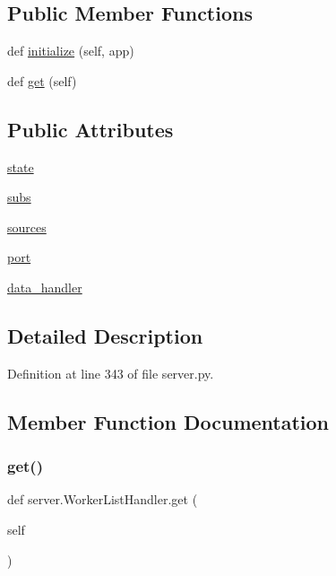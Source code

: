 \subsection*{Public Member Functions}
\begin{DoxyCompactItemize}
\item 
def \hyperlink{classserver_1_1WorkerListHandler_a843945560a336050078a4e45bd4f12ba}{initialize} (self, app)
\item 
def \hyperlink{classserver_1_1WorkerListHandler_a96fc3c606b269d6f70a0c14b08bb4e0b}{get} (self)
\end{DoxyCompactItemize}
\subsection*{Public Attributes}
\begin{DoxyCompactItemize}
\item 
\hyperlink{classserver_1_1WorkerListHandler_a3d10f8de1ae4dbd639972512931b53b1}{state}
\item 
\hyperlink{classserver_1_1WorkerListHandler_a8a1b224826f80c3c6ac6ac55e7eabdaa}{subs}
\item 
\hyperlink{classserver_1_1WorkerListHandler_a91d0b6cd460f20dd204a8eae99a34852}{sources}
\item 
\hyperlink{classserver_1_1WorkerListHandler_af6ff3649c325b59e2c3446fdca751726}{port}
\item 
\hyperlink{classserver_1_1WorkerListHandler_ae749c1c421deeb18425c78e9cad74138}{data\+\_\+handler}
\end{DoxyCompactItemize}


\subsection{Detailed Description}


Definition at line 343 of file server.\+py.



\subsection{Member Function Documentation}
\mbox{\label{classserver_1_1WorkerListHandler_a96fc3c606b269d6f70a0c14b08bb4e0b}} 
\subsubsection{\texorpdfstring{get()}{get()}}
{\footnotesize\ttfamily def server.\+Worker\+List\+Handler.\+get (\begin{DoxyParamCaption}\item[{}]{self }\end{DoxyParamCaption})}



